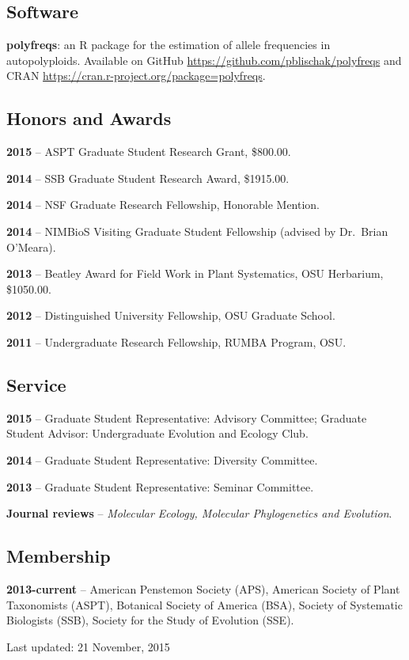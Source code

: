 \documentclass[]{article}
\begin{document}
\subsection{\texorpdfstring{\textbf{Software}}{Software}}\label{software}

\textbf{polyfreqs}: an R package for the estimation of allele
frequencies in autopolyploids. Available on GitHub 
\href{https://github.com/pblischak/polyfreqs}{\url{https://github.com/pblischak/polyfreqs}} and CRAN 
\href{https://cran.r-project.org/package=polyfreqs}{\url{https://cran.r-project.org/package=polyfreqs}}.

\subsection{\texorpdfstring{\textbf{Honors and
Awards}}{Honors and Awards}}\label{honors-and-awards}

\textbf{2015} -- ASPT Graduate Student Research Grant, \$800.00.

\textbf{2014} -- SSB Graduate Student Research Award, \$1915.00.

\textbf{2014} -- NSF Graduate Research Fellowship, Honorable Mention.

\textbf{2014} -- NIMBioS Visiting Graduate Student Fellowship (advised
by Dr.~Brian O'Meara).

\textbf{2013} -- Beatley Award for Field Work in Plant Systematics, OSU
Herbarium, \$1050.00.

\textbf{2012} -- Distinguished University Fellowship, OSU Graduate
School.

\textbf{2011} -- Undergraduate Research Fellowship, RUMBA Program, OSU.

\subsection{\texorpdfstring{\textbf{Service}}{Service}}\label{service}

\textbf{2015} -- Graduate Student Representative: Advisory Committee; Graduate Student Advisor: Undergraduate Evolution and Ecology Club.

\textbf{2014} -- Graduate Student Representative: Diversity Committee.

\textbf{2013} -- Graduate Student Representative: Seminar Committee.

\textbf{Journal reviews} -- \emph{Molecular Ecology, Molecular Phylogenetics and
Evolution}.

\subsection{\texorpdfstring{\textbf{Membership}}{Membership}}\label{membership}

\textbf{2013-current} -- American Penstemon Society (APS), American
Society of Plant Taxonomists (ASPT), Botanical Society of America (BSA),
Society of Systematic Biologists (SSB), Society for the Study of
Evolution (SSE).

\begin{center}
{\small Last updated: 21 November, 2015}
\end{center}
\end{document}
